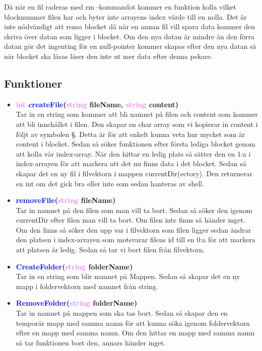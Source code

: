 \documentclass[a4paper,11pt]{article}
\newcommand{\colorFunction}[1]{\textcolor{blue}{#1}}
\newcommand{\colorType}[1]{\textcolor{violet}{#1}}
\begin{document}
Då när en fil raderas med rm -kommandot kommer en funktion kolla vilket blocknummer filen har och byter inte arrayens index värde till en nolla. Det är inte nödvändigt att rensa blocket då när en annan fil vill spara data kommer den skriva över datan som ligger i blocket. Om den nya datan är mindre än den förra datan gör det ingenting för en null-pointer kommer skapas efter den nya datan så när blocket ska läsas läser den inte ut mer data efter denna pekare.
\subsection{Funktioner}
\begin{itemize}
\item \textbf{\colorType{int} \colorFunction{createFile}(\colorType{string} fileName, \colorType{string} content)} \\
Tar in en string som kommer att bli namnet på filen och content som kommer att bli innehållet i filen. Den skapar en char array som vi kopierar in content i följt av symbolen §. Detta är för att enkelt kunna veta hur mycket som är content i blocket. Sedan så söker funktionen efter första lediga blocket genom att kolla vår index-array. När den hittar en ledig plats så sätter den en 1:a i index-arrayen för att markera att det nu finns data i det blocket. Sedan så skapar det en ny fil i filvektorn i mappen currentDir(ectory). Den returnerar en int om det gick bra eller inte som sedan hanteras av shell.

\item \textbf{\colorFunction{removeFile}(\colorType{string} fileName)} \\
Tar in namnet på den filen som man vill ta bort. Sedan så söker den igenom currentDir efter filen man vill ta bort. Om filen inte finns så händer inget. Om den finns så söker den upp var i filvektorn som filen ligger sedan ändrar den platsen i index-arrayen som motsvarar filens id till en 0:a för att markera att platsen är ledig. Sedan så tar vi bort filen från filvektorn.

\item \textbf{\colorFunction{CreateFolder}(\colorType{string} folderName)} \\
Tar in en string som blir namnet på Mappen. Sedan så skapar det en ny mapp i foldervektorn med namnet från string.

\item \textbf{\colorFunction{RemoveFolder}(\colorType{string} folderName)} \\
Tar in namnet på mappen som ska tas bort. Sedan så skapar den en temporär mapp med samma namn för att kunna söka igenom foldervektorn efter en mapp med samma namn. Om den hittar en mapp med samma namn så tar funktionen bort den, annars händer inget.


\end{itemize}
\end{document}
